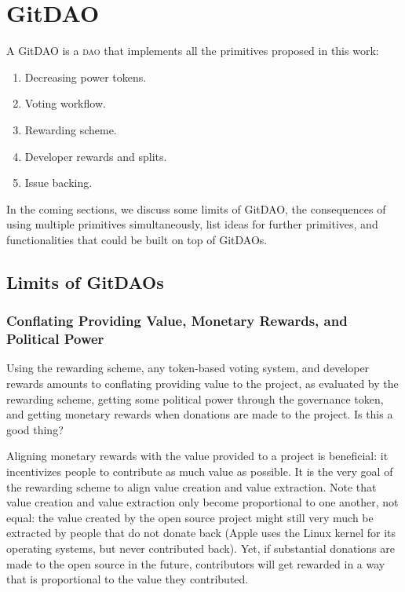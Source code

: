 \chapter{GitDAO}
\label{sec:further_analysis}

A GitDAO is a \textsc{dao} that implements all the primitives proposed in this work:

\begin{enumerate}
  \item Decreasing power tokens.
  \item Voting workflow.
  \item Rewarding scheme.
  \item Developer rewards and splits.
  \item Issue backing.
\end{enumerate}

In the coming sections, we discuss some limits of GitDAO, the consequences of using multiple primitives simultaneously, list ideas for further primitives, and functionalities that could be built on top of GitDAOs.

\section{Limits of GitDAOs}

\subsection{Conflating Providing Value, Monetary Rewards, and Political Power}

Using the rewarding scheme, any token-based voting system, and developer rewards amounts to conflating providing value to the project, as evaluated by the rewarding scheme, getting some political power through the governance token, and getting monetary rewards when donations are made to the project.
Is this a good thing?

Aligning monetary rewards with the value provided to a project is beneficial: it incentivizes people to contribute as much value as possible.
It is the very goal of the rewarding scheme to align value creation and value extraction.
Note that value creation and value extraction only become proportional to one another, not equal: the value created by the open source project might still very much be extracted by people that do not donate back (Apple uses the Linux kernel for its operating systems, but never contributed back).
Yet, if substantial donations are made to the open source in the future, contributors will get rewarded in a way that is proportional to the value they contributed.

